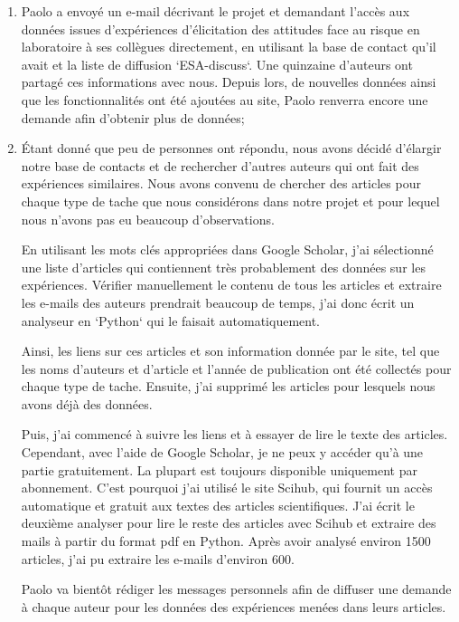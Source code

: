 \documentclass[12pt]{article}
\begin{document}
\begin{enumerate}
\item Paolo a envoyé un e-mail décrivant le projet et demandant l'accès aux données issues d'expériences d'élicitation des attitudes face au risque en laboratoire à ses collègues directement, en utilisant la base de contact qu'il avait et la liste de diffusion `ESA-discuss`. Une quinzaine d'auteurs ont partagé ces informations avec nous. Depuis lors, de nouvelles données ainsi que les fonctionnalités ont été ajoutées au site, Paolo renverra encore une demande afin d'obtenir plus de données; 
\item Étant donné que peu de personnes ont répondu, nous avons décidé d'élargir notre base de contacts et de rechercher d'autres auteurs qui ont fait des expériences similaires. Nous avons convenu de chercher des articles pour chaque type de tache que nous considérons dans notre projet et pour lequel nous n'avons pas eu beaucoup d'observations.

En utilisant les mots clés appropriées dans Google Scholar, j'ai sélectionné une liste d'articles qui contiennent très probablement des données sur les expériences. Vérifier manuellement le contenu de tous les articles et extraire les e-mails des auteurs prendrait beaucoup de temps, j'ai donc écrit un analyseur en `Python` qui le faisait automatiquement.

Ainsi, les liens sur ces articles et son information donnée par le site, tel que les noms d'auteurs et d'article et l'année de publication ont été collectés pour chaque type de tache. Ensuite, j'ai supprimé les articles pour lesquels nous avons déjà des données.

Puis, j'ai commencé à suivre les liens et à essayer de lire le texte des articles. Cependant, avec l'aide de Google Scholar, je ne peux y accéder qu'à une partie gratuitement. La plupart est toujours disponible uniquement par abonnement. C’est pourquoi j'ai utilisé le site Scihub, qui fournit un accès automatique et gratuit aux textes des articles scientifiques. J'ai écrit le deuxième analyser pour lire le reste des articles avec Scihub et extraire des mails à partir du format pdf en Python. Après avoir analysé environ 1500 articles, j'ai pu extraire les e-mails d'environ 600. 

Paolo va bientôt rédiger les messages personnels afin de diffuser une demande à chaque auteur pour les données des expériences menées dans leurs articles.

\end{enumerate}
\end{document}
